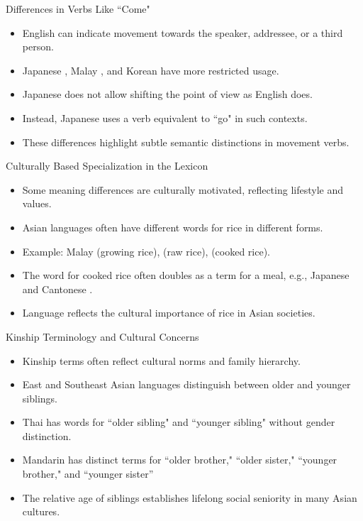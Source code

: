 \documentclass{beamer}
\begin{document}
\begin{frame}{Differences in Verbs Like ``Come"}
    \begin{itemize}
        \item English  can indicate movement towards the speaker, addressee, or a third person.
        \item Japanese , Malay , and Korean  have more restricted usage.
        \item Japanese does not allow shifting the point of view as English  does.
        \item Instead, Japanese uses a verb equivalent to ``go" in such contexts.
        \item These differences highlight subtle semantic distinctions in movement verbs.
    \end{itemize}
\end{frame}

\begin{frame}{Culturally Based Specialization in the Lexicon}
    \begin{itemize}
        \item Some meaning differences are culturally motivated, reflecting lifestyle and values.
        \item Asian languages often have different words for rice in different forms.
        \item Example: Malay  (growing rice),  (raw rice),  (cooked rice).
        \item The word for cooked rice often doubles as a term for a meal, e.g., Japanese  and Cantonese .
        \item Language reflects the cultural importance of rice in Asian societies.
    \end{itemize}
\end{frame}

\begin{frame}{Kinship Terminology and Cultural Concerns}
    \begin{itemize}
        \item Kinship terms often reflect cultural norms and family hierarchy.
        \item East and Southeast Asian languages distinguish between older and younger siblings.
        \item Thai has words for ``older sibling" and ``younger sibling" without gender distinction.
        \item Mandarin has distinct terms for ``older brother," ``older sister," ``younger brother," and ``younger sister''
        \item The relative age of siblings establishes lifelong social seniority in many Asian cultures.
    \end{itemize}
\end{frame}
\end{document}
